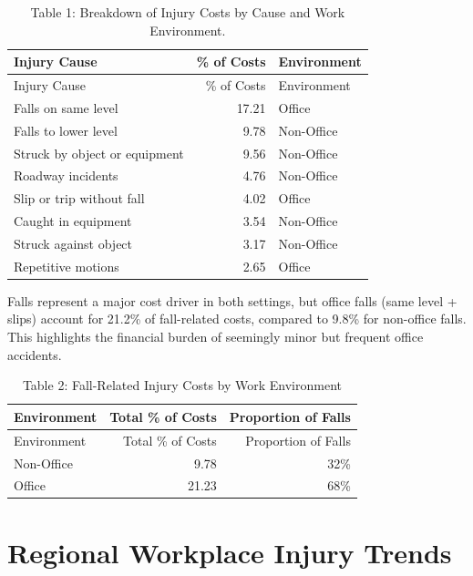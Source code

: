 \documentclass[
  letterpaper,
  DIV=11,
  numbers=noendperiod]{scrreprt}
\begin{document}
\begin{longtable}[]{@{}lrl@{}}
\caption{Table 1: Breakdown of Injury Costs by Cause and Work
Environment.}\tabularnewline
\toprule\noalign{}
Injury Cause & \% of Costs & Environment \\
\midrule\noalign{}
\endfirsthead
\toprule\noalign{}
Injury Cause & \% of Costs & Environment \\
\midrule\noalign{}
\endhead
\bottomrule\noalign{}
\endlastfoot
Falls on same level & 17.21 & Office \\
Falls to lower level & 9.78 & Non-Office \\
Struck by object or equipment & 9.56 & Non-Office \\
Roadway incidents & 4.76 & Non-Office \\
Slip or trip without fall & 4.02 & Office \\
Caught in equipment & 3.54 & Non-Office \\
Struck against object & 3.17 & Non-Office \\
Repetitive motions & 2.65 & Office \\
\end{longtable}

Falls represent a major cost driver in both settings, but office falls
(same level + slips) account for 21.2\% of fall-related costs, compared
to 9.8\% for non-office falls. This highlights the financial burden of
seemingly minor but frequent office accidents.

\begin{longtable}[]{@{}lrr@{}}
\caption{Table 2: Fall-Related Injury Costs by Work
Environment}\tabularnewline
\toprule\noalign{}
Environment & Total \% of Costs & Proportion of Falls \\
\midrule\noalign{}
\endfirsthead
\toprule\noalign{}
Environment & Total \% of Costs & Proportion of Falls \\
\midrule\noalign{}
\endhead
\bottomrule\noalign{}
\endlastfoot
Non-Office & 9.78 & 32\% \\
Office & 21.23 & 68\% \\
\end{longtable}

\section{Regional Workplace Injury
Trends}\label{regional-workplace-injury-trends}
\end{document}
